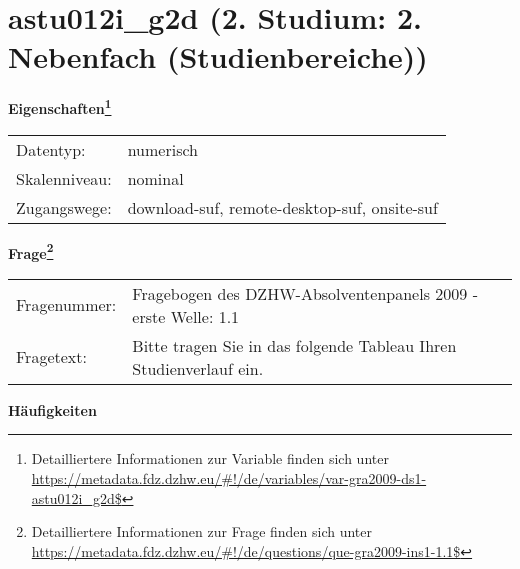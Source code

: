 
    \setcounter{footnote}{0}

    \vspace*{-1.8cm}
	\section{astu012i\_g2d (2. Studium: 2. Nebenfach (Studienbereiche))}
	\label{section:astu012i_g2d}



    \vspace*{0.5cm}
    \noindent\textbf{Eigenschaften\footnote{Detailliertere Informationen zur Variable finden sich unter
		\url{https://metadata.fdz.dzhw.eu/\#!/de/variables/var-gra2009-ds1-astu012i_g2d$}}}\\
	\begin{tabularx}{\hsize}{@{}lX}
	Datentyp: & numerisch \\
	Skalenniveau: & nominal \\
	Zugangswege: &
	  download-suf, 
	  remote-desktop-suf, 
	  onsite-suf
 \\
    \end{tabularx}



				\vspace*{0.5cm}
                \noindent\textbf{Frage\footnote{Detailliertere Informationen zur Frage finden sich unter
		              \url{https://metadata.fdz.dzhw.eu/\#!/de/questions/que-gra2009-ins1-1.1$}}}\\
				\begin{tabularx}{\hsize}{@{}lX}
					Fragenummer: &
					  Fragebogen des DZHW-Absolventenpanels 2009 - erste Welle:
					  1.1
 \\
					Fragetext: & Bitte tragen Sie in das folgende Tableau Ihren Studienverlauf ein. \\
				\end{tabularx}





        		\vspace*{0.5cm}
                \noindent\textbf{Häufigkeiten}

